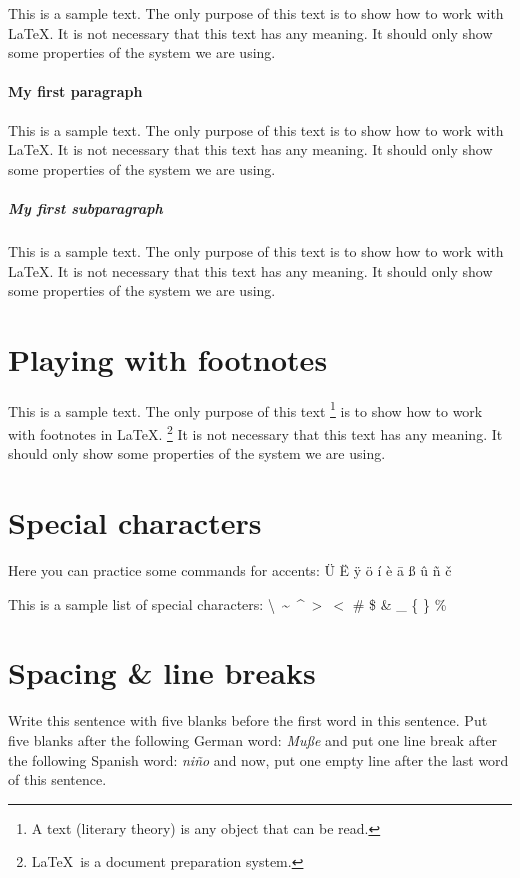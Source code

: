 \documentclass[10pt, paper=a4, abstracton]{scrartcl}
\begin{document}
This is a sample text. The only purpose of this text is to show how to work with \LaTeX . It is not necessary that this text has any meaning. It should only show some properties of the system we are using. 


\paragraph[First paragraph]{My first paragraph}

This is a sample text. The only purpose of this text is to show how to work with \LaTeX . It is not necessary that this text has any meaning. It should only show some properties of the system we are using. 


\subparagraph[First subparagraph]{My first subparagraph}

This is a sample text. The only purpose of this text is to show how to work with \LaTeX . It is not necessary that this text has any meaning. It should only show some properties of the system we are using. 


\section[Footnotes]{Playing with footnotes}

This is a sample text. The only purpose of this text%
%
\footnote{A text (literary theory) is any object that can be read.} %
%
is to show how to work with footnotes in \LaTeX .%
%
\footnote{\LaTeX\ is a document preparation system.} %
%
It is not necessary that this text has any meaning. It should only show some properties of the system we are using. 


\section{Special characters}

Here you can practice some commands for accents: \"U \"E \"y \"o \'i \`e \=a \ss{} \^u \~n \v{c} 


\noindent This is a sample list of special characters: \textbackslash\ \textasciitilde\ \textasciicircum\ 
\textgreater\ $<$ \textbar \#  \$  \&  \_  \{  \}  \%


\section{Spacing \& line breaks}

  Write this sentence with five blanks before the first word in this sentence. Put five blanks after the following German word: \textit{Mu{\ss}e}      and put one line break after the following Spanish word: \textit{ni\~no}
  and now, put one empty line after the last word of this sentence.
  
\end{document}
